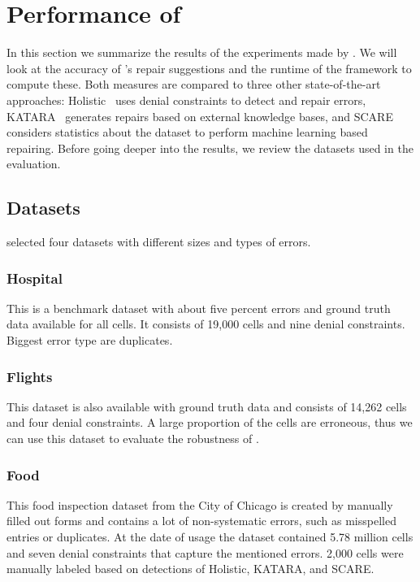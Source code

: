 \section{Performance of \holoclean{}}\label{sec:performance}
  In this section we summarize the results of the experiments made by \citeauthor{holoclean}.
  We will look at the accuracy of \holoclean{}'s repair suggestions and the runtime of the framework to compute these.
  Both measures are compared to three other state-of-the-art approaches:
  Holistic~\cite{holistic} uses denial constraints to detect and repair errors,
  KATARA~\cite{katara} generates repairs based on external knowledge bases, and
  SCARE~\cite{scare} considers statistics about the dataset to perform machine learning based repairing.
  Before going deeper into the results, we review the datasets used in the evaluation.

  \subsection{Datasets}
  \citeauthor{holoclean} selected four datasets with different sizes and types of errors.

  \subsubsection*{Hospital}
  This is a benchmark dataset with about five percent errors and ground truth data available for all cells.
  It consists of 19,000 cells and nine denial constraints.
  Biggest error type are duplicates.

  \subsubsection*{Flights}
  This dataset is also available with ground truth data and consists of 14,262 cells and four denial constraints.
  A large proportion of the cells are erroneous, thus we can use this dataset to evaluate the robustness of \holoclean{}.

  \subsubsection*{Food}
  This food inspection dataset from the City of Chicago is created by manually filled out forms and contains a lot of non-systematic errors, such as misspelled entries or duplicates.
  At the date of usage the dataset contained 5.78 million cells and seven denial constraints that capture the mentioned errors.
  2,000 cells were manually labeled based on detections of Holistic, KATARA, and SCARE.

